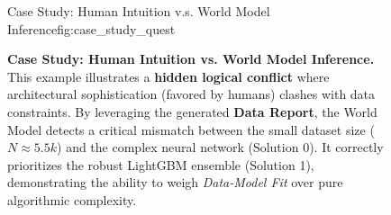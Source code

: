 \begin{figure}
\begin{CaseStudyFrame}{Case Study: Human Intuition v.s. World Model Inference}{fig:case_study_quest}
    \end{CaseStudyFrame}
    
    \caption{\textbf{Case Study: Human Intuition vs. World Model Inference.} This example illustrates a \textbf{hidden logical conflict} where architectural sophistication (favored by humans) clashes with data constraints. By leveraging the generated \textbf{Data Report}, the World Model detects a critical mismatch between the small dataset size ($N \approx 5.5k$) and the complex neural network (Solution 0). It correctly prioritizes the robust LightGBM ensemble (Solution 1), demonstrating the ability to weigh \textit{Data-Model Fit} over pure algorithmic complexity.}

    \label{fig:case_study_quest}
\end{figure}





